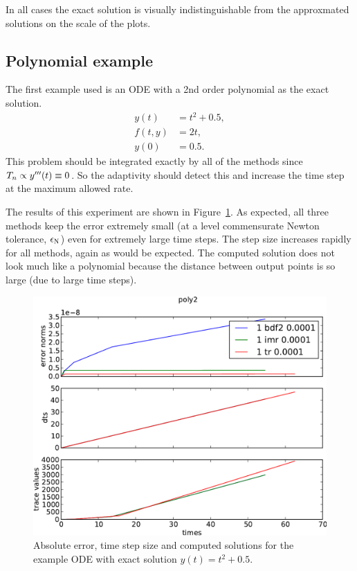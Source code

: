 In all cases the exact solution is visually indistinguishable from the approxmated solutions on the scale of the plots.


\subsection{Polynomial example}
\label{sec:imr-polynomial-example}

The first example used is an ODE with a 2nd order polynomial as the exact solution.
\begin{equation}
  \label{eqn:imr-test-poly2}
  \begin{aligned}
    y(t) &= t^2 + 0.5, \\
    f(t,y) &= 2t, \\
    y(0) & = 0.5.
  \end{aligned}
\end{equation}
This problem should be integrated exactly by all of the methods since $T_n \propto y'''(t) \equiv 0$.
So the adaptivity should detect this and increase the time step at the maximum allowed rate.

The results of this experiment are shown in Figure~\ref{fig:imr-poly2-example}. 
As expected, all three methods keep the error extremely small (at a level commensurate Newton tolerance, $\epsilon_{\text{N}}$) even for extremely large time steps.
The step size increases rapidly for all methods, again as would be expected.
The computed solution does not look much like a polynomial because the distance between output points is so large (due to large time steps).

\begin{figure}[h!]
  \centering
  \includegraphics[width=1\textwidth]{aimr/poly2-errornormsvs-dtsvs-tracevaluesvstimes}
  \caption{Absolute error, time step size and computed solutions for the example ODE with exact solution $y(t) = t^2 + 0.5$.}
  \label{fig:imr-poly2-example}
\end{figure}


